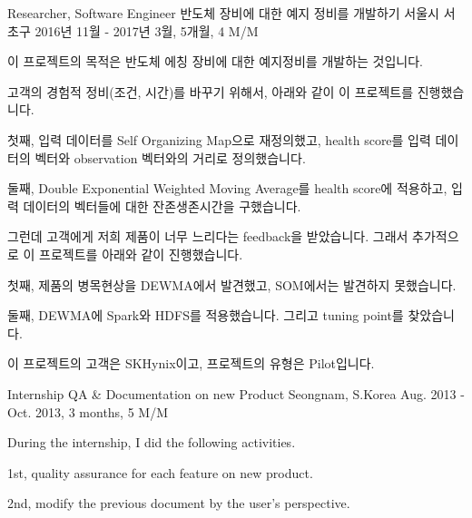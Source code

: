 \begin{cventries}
  \cventry
    {Researcher, Software Engineer} %
    {반도체 장비에 대한 예지 정비를 개발하기} %
    {서울시 서초구} %
    {2016년 11월 - 2017년 3월, 5개월, 4 M/M} %
    {
      \begin{cvitems} %
        \item {이 프로젝트의 목적은 반도체 에칭 장비에 대한 예지정비를 개발하는 것입니다.}
        \item {고객의 경험적 정비(조건, 시간)를 바꾸기 위해서, 아래와 같이 이 프로젝트를 진행했습니다.}
        \item {첫째, 입력 데이터를 Self Organizing Map으로 재정의했고, health score를 입력 데이터의 벡터와 observation 벡터와의 거리로 정의했습니다.}
        \item {둘째, Double Exponential Weighted Moving Average를 health score에 적용하고, 입력 데이터의 벡터들에 대한 잔존생존시간을 구했습니다.}
        \item {그런데 고객에게 저희 제품이 너무 느리다는 feedback을 받았습니다. 그래서 추가적으로 이 프로젝트를 아래와 같이 진행했습니다.}
        \item {첫째, 제품의 병목현상을 DEWMA에서 발견했고, SOM에서는 발견하지 못했습니다.}
        \item {둘째, DEWMA에 Spark와 HDFS를 적용했습니다. 그리고 tuning point를 찾았습니다.}
        \item {이 프로젝트의 고객은 SKHynix이고, 프로젝트의 유형은 Pilot입니다.}
      \end{cvitems}
    }

  \cventry
    {Internship} %
    {QA \& Documentation on new Product} %
    {Seongnam, S.Korea} %
    {Aug. 2013 - Oct. 2013, 3 months, 5 M/M} %
    {
      \begin{cvitems} %
        \item {During the internship, I did the following activities.}
        \item {1st, quality assurance for each feature on new product.}
        \item {2nd, modify the previous document by the user's perspective.}
      \end{cvitems}
    }

\end{cventries}
